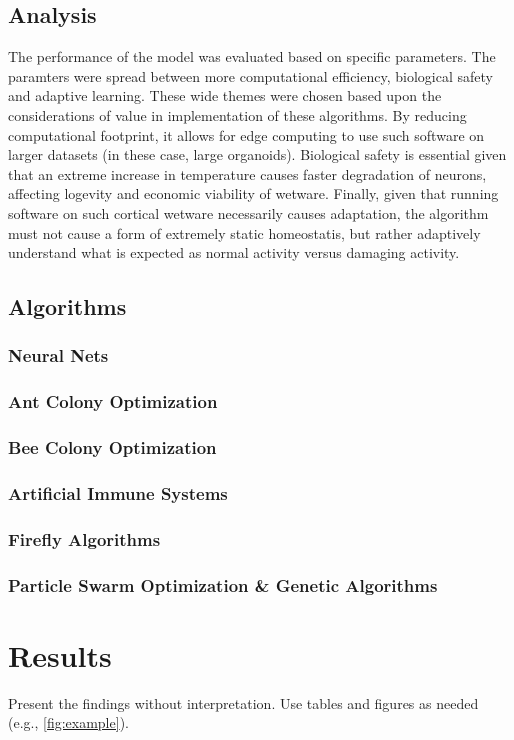 \documentclass[11pt,a4paper]{article}
\begin{document}
\subsection{Analysis}
The performance of the model was evaluated based on specific parameters. The paramters were spread between more computational efficiency,
biological safety and adaptive learning. These wide themes were chosen based upon the considerations of value in implementation of these algorithms.
By reducing computational footprint, it allows for edge computing to use such software on larger datasets (in these case, large organoids). Biological
safety is essential given that an extreme increase in temperature causes faster degradation of neurons, affecting logevity and economic viability of wetware. Finally,
given that running software on such cortical wetware necessarily causes adaptation, the algorithm must not cause a form of extremely static 
homeostatis, but rather adaptively understand what is expected as normal activity versus damaging activity.


\subsection{Algorithms}
\subsubsection*{Neural Nets}
\subsubsection*{Ant Colony Optimization}
\subsubsection*{Bee Colony Optimization}
\subsubsection*{Artificial Immune Systems}
\subsubsection*{Firefly Algorithms}
\subsubsection*{Particle Swarm Optimization \& Genetic Algorithms}


\section{Results}
Present the findings without interpretation. Use tables and figures as needed (e.g., \cref{fig:example}).
\end{document}
